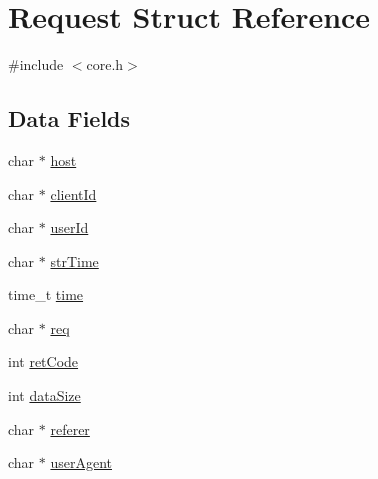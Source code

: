 \hypertarget{struct_request}{\section{Request Struct Reference}
\label{struct_request}
}


{\ttfamily \#include $<$core.\-h$>$}

\subsection*{Data Fields}
\begin{DoxyCompactItemize}
\item 
char $\ast$ \hyperlink{struct_request_a1c2046dcb30a629d6d9f45ff8f403f12}{host}
\item 
char $\ast$ \hyperlink{struct_request_afc6a49356b7210c7af4fdaec589c2501}{client\-Id}
\item 
char $\ast$ \hyperlink{struct_request_ad9215e76385d60b36fa2ee2a903e8005}{user\-Id}
\item 
char $\ast$ \hyperlink{struct_request_aaf3a44ace5539215bc080105d7b58bca}{str\-Time}
\item 
time\-\_\-t \hyperlink{struct_request_ab842bdb7d02be824fb48613032b4ff36}{time}
\item 
char $\ast$ \hyperlink{struct_request_ab47351fd475e3902c6d5da9e09474834}{req}
\item 
int \hyperlink{struct_request_a1ff5ada708c1e7c8f38abc41907506ba}{ret\-Code}
\item 
int \hyperlink{struct_request_a8c8e474bb8d2c6f7162455416b488e50}{data\-Size}
\item 
char $\ast$ \hyperlink{struct_request_a1385d5da8c765cd03076f404f49a9b2c}{referer}
\item 
char $\ast$ \hyperlink{struct_request_a4689522b836b1d00731611b760aab9de}{user\-Agent}
\end{DoxyCompactItemize}



